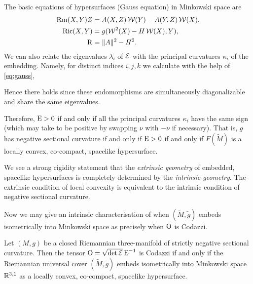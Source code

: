 \documentclass[a4paper,12pt]{amsart}
\begin{document}
The basic equations of hypersurfaces (Gauss equation) in Minkowski space are
\begin{equation}
\label{eq:gauss}
\begin{split}
\operatorname{Rm}(X, Y) Z &= A(X, Z) \operatorname{\mathcal{W}}(Y) - A(Y, Z) \operatorname{\mathcal{W}}(X), \\
\operatorname{Ric}(X, Y) &= g(\operatorname{\mathcal{W}}^2(X) - H \operatorname{\mathcal{W}}(X), Y), \\
\operatorname{R} &= \|A\|^2 - H^2.
\end{split}
\end{equation}
We can also relate the eigenvalues $\lambda_{i}$ of $\operatorname{\mathcal{E}}$ with the principal curvatures $\kappa_{i}$ of the embedding. Namely, for distinct indices \(i,j,k\) we calculate with the help of \eqref{eq:gauss},

Hence there holds
since these endomorphisms are simultaneously diagonalizable and share the same eigenvalues.

Therefore, \(\operatorname{E} > 0\) if and only if all the principal curvatures \(\kappa_i\) have the same sign (which may take to be positive by swapping \(\nu\) with \(-\nu\) if necessary). That is, \(g\) has negative sectional curvature if and only if \(\operatorname{E} > 0\) if and only if \(F(\tilde{M})\) is a locally convex, co-compact, spacelike hypersurface.

\begin{rem}
We see a strong rigidity statement that the \emph{extrinsic geometry} of embedded, spacelike hypersurfaces is completely determined by the \emph{intrinsic geometry}. The extrinsic condition of local convexity is equivalent to the intrinsic condition of negative sectional curvature.
\end{rem}

Now we may give an intrinsic characterisation of when \((\tilde{M}, \tilde{g})\) embeds isometrically into Minkowski space as precisely when \(\operatorname{O}\) is Codazzi.

\begin{thm}
\label{thm:intg_embed}

Let \((M, g)\) be a closed Riemannian three-manifold of strictly negative sectional curvature. Then the tensor \(\operatorname{O} = \sqrt{\det \operatorname{\mathcal{E}}} \operatorname{E}^{-1}\) is Codazzi if and only if the Riemannian universal cover \((\tilde{M}, \tilde{g})\) embeds isometrically into Minkowski space \(\mathbb{R}^{3,1}\) as a locally convex, co-compact, spacelike hypersurface.
\end{thm}
\end{document}
